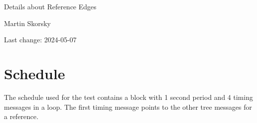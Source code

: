 \documentclass[12pt,a4paper]{report}
\begin{document}
\begin{titlepage}
\vspace{2cm}
\begin{center}
\Huge{Details about Reference Edges}

\Large{Martin Skorsky}

\Large{Last change: 2024-05-07}
\end{center}
\vfill
\end{titlepage}

\tableofcontents

\chapter{Schedule}
The schedule used for the test contains a block with 1 second period and 4 timing messages in a loop.
The first timing message points to the other tree messages for a reference.



\end{document}
